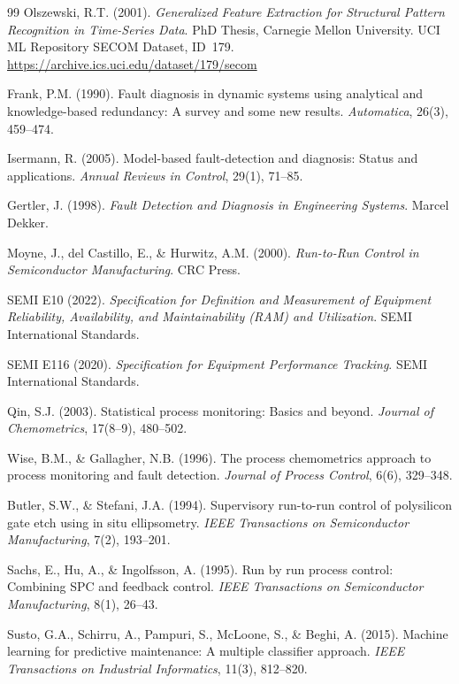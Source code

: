 \documentclass[11pt,letterpaper]{article}
\theoremstyle{scresult}
\begin{document}
\begin{thebibliography}{99}
Olszewski, R.T. (2001).
\textit{Generalized Feature Extraction for Structural Pattern Recognition
in Time-Series Data}. PhD Thesis, Carnegie Mellon University.
UCI ML Repository SECOM Dataset, ID~179.
\url{https://archive.ics.uci.edu/dataset/179/secom}

Frank, P.M. (1990).
Fault diagnosis in dynamic systems using analytical and knowledge-based
redundancy: A survey and some new results.
\textit{Automatica}, 26(3), 459--474.

Isermann, R. (2005).
Model-based fault-detection and diagnosis: Status and applications.
\textit{Annual Reviews in Control}, 29(1), 71--85.

Gertler, J. (1998).
\textit{Fault Detection and Diagnosis in Engineering Systems}.
Marcel Dekker.

Moyne, J., del Castillo, E., \& Hurwitz, A.M. (2000).
\textit{Run-to-Run Control in Semiconductor Manufacturing}.
CRC Press.

SEMI E10 (2022).
\textit{Specification for Definition and Measurement of Equipment Reliability,
Availability, and Maintainability (RAM) and Utilization}.
SEMI International Standards.

SEMI E116 (2020).
\textit{Specification for Equipment Performance Tracking}.
SEMI International Standards.

Qin, S.J. (2003).
Statistical process monitoring: Basics and beyond.
\textit{Journal of Chemometrics}, 17(8--9), 480--502.

Wise, B.M., \& Gallagher, N.B. (1996).
The process chemometrics approach to process monitoring and fault detection.
\textit{Journal of Process Control}, 6(6), 329--348.

Butler, S.W., \& Stefani, J.A. (1994).
Supervisory run-to-run control of polysilicon gate etch using in situ
ellipsometry.
\textit{IEEE Transactions on Semiconductor Manufacturing}, 7(2), 193--201.

Sachs, E., Hu, A., \& Ingolfsson, A. (1995).
Run by run process control: Combining SPC and feedback control.
\textit{IEEE Transactions on Semiconductor Manufacturing}, 8(1), 26--43.

Susto, G.A., Schirru, A., Pampuri, S., McLoone, S., \& Beghi, A. (2015).
Machine learning for predictive maintenance: A multiple classifier approach.
\textit{IEEE Transactions on Industrial Informatics}, 11(3), 812--820.


\end{thebibliography}
\end{document}
